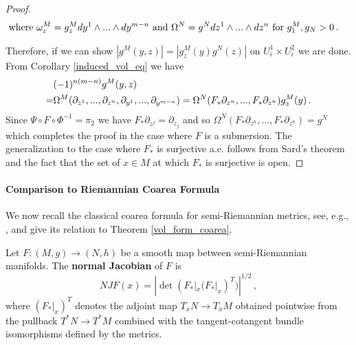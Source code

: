 \begin{proof}
\begin{align}
&\text{where }\omega^M_z=g^M_z dy^1\wedge...\wedge dy^{m-n} \text{ and }\Omega^N=g^N dz^1\wedge...\wedge dz^n \text{ for } g_1^M,g_N>0\,.\notag
\end{align}
\begin{comment}
Here we used that if \pi_1\circ \Phi is the chart on F^{-1}(z) then the inverse is y->\Phi^{-1}(y,Psi(z)) since \pi_2\circ\Phi(x)=\Psi(z)
for any x\in F^{-1}(z)
\end{comment}
Therefore, if we can show $|g^M(y,z)|=|g_z^M(y)g^N(z)|$ on $U_i^1\times U_i^2$ we are done. From Corollary \ref{induced_vol_eq} we have
\begin{align}
&(-1)^{n(m-n)} g^M(y,z)\\
=&\Omega^M(\partial_{z^1},...,\partial_{z^n},\partial_{y^1},...,\partial_{y^{m-n}})=\Omega^N(F_*\partial_{z^n},...,F_*\partial_{z^n})g_z^M(y)\,.\notag
\end{align}
Since $\Psi\circ F\circ\Phi^{-1}=\pi_2$ we have $F_*\partial_{z^j}=\partial_{z_j}$ and so $\Omega^N(F_*\partial_{z^n},...,F_*\partial_{z^n})=g^N$ which completes the proof in the case where $F$ is a submersion.  The generalization to the case where $F_*$ is surjective a.e. follows from Sard's theorem and the fact that the set of $x\in M$ at which $F_*$ is surjective is open.

\begin{comment}
The set K of $x\in M$ where $F_*$ is surjective is open in M by the rank theorem and by assumption, its complement has M-measure zero.  Therefore the lhs equal int_K f dOmega^M. F is a submersion on $K$ so   int_K f dOmega^M=int_N int_F|K^{-1}(z) f omega^M_z Omega^N.  Split this into an integral over regular values of $F:M->N$ and crit values.  The int over crit values is zero by Sard.  For z a regular value, F|_K^{-1}(z)=F^{-1}(z) Hence the lhs is int_N_ref int_F^{-1}(z) f omega^M_z Omega^N. 

  Split the rhs into integral over critical  values of F:M->N and regular values.  The integral over crit values is
 zero by sard, hence the rhs is
int_N_reg int F^{-1}(z).  Therefore they are equal.  QED
\end{comment}
\end{proof}
\paragraph{Comparison to Riemannian Coarea Formula}
We now recall the classical coarea formula for semi-Riemannian metrics, see, e.g., \cite{chavel1995riemannian},  and give its relation to Theorem \ref{vol_form_coarea}.
\begin{definition}
Let $F:(M,g)\rightarrow (N,h)$ be a smooth map between semi-Riemannian manifolds.  The {\bf normal Jacobian} of $F$ is
\begin{equation}
NJF(x)=|\det(F_*|_x(F_*|_x)^T)|^{1/2}\,,
\end{equation}
where $(F_*|_x)^T$ denotes the adjoint map $T_xN\rightarrow T_xM$ obtained pointwise from the pullback $T^*N\rightarrow T^*M$ combined with the tangent-cotangent bundle isomorphisms defined by the metrics.
\end{definition}

